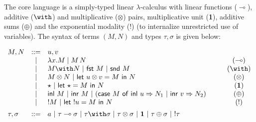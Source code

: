\documentclass{llncs}
\newcommand{\lolli}{\multimap}
\newcommand{\tensor}{\otimes}
\newcommand{\one}{\mathbf{1}}
\newcommand{\bang}{{!}}
\newcommand{\llet}[2]{\mathsf{let}\ #1\ \mathsf{in}\ #2}
\begin{document}
The core language is a simply-typed linear $\lambda$-calculus with linear
functions ($\lolli$), additive ($\with$) and multiplicative
($\tensor$) pairs, 
multiplicative unit (\textbf{1}), additive sums ($\oplus$)
and the exponential modality ($\bang$) (to internalize unrestricted
use of variables). The syntax of terms $(M,N)$ and types $\tau, \sigma$ is given below:


%

\[
  \begin{array}{lclcc}
    M,N & ::= & u, v & \quad & \\
        & \mid & \lambda x.M \mid M\, N & & (\lolli) \\
        & \mid & M \with N\ \vert\ \mathsf{fst}\ M\ \vert\
                 \mathsf{snd}\ M && (\with) \\
        & \mid & M \tensor N\ \vert\ \llet{u\tensor v = M}{N} && (\tensor)\\
        & \mid & \star\ \vert\ \llet{\star = M}{N} && (\one) \\
        & \mid & \mathsf{inl}\ M\ \vert\ \mathsf{inr}\ M\ \vert\ (\mathsf{case}\
    M\ \mathsf{of\ inl}\ u \Rightarrow N_1\ \vert\ \mathsf{inr}\ v \Rightarrow
                 N_2) && (\oplus)\\
        & \mid & \bang M\ \vert\ \llet{\bang u = M}{N} && (\bang)\\[0,5em]
    \tau, \sigma & ::= & a\ \vert\ \tau \lolli \sigma\ \vert\ \tau \with \sigma\
    \vert\ \tau \tensor \sigma\ \vert\ \mathbf{1}\ \vert\ \tau \oplus \sigma\ \vert\ \bang \tau
  \end{array}
  \]

\end{document}
